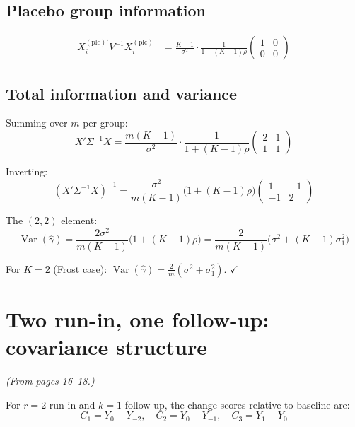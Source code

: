 \documentclass[11pt]{article}
\DeclareMathOperator{\Var}{Var}
\begin{document}
\subsection{Placebo group information}

\begin{align}
  X_i^{(\text{plc})\prime} V^{-1} X_i^{(\text{plc})}
  &= \frac{K-1}{\sigma^2}\cdot
    \frac{1}{1 + (K-1)\rho}
    \begin{pmatrix}1&0\\0&0\end{pmatrix}
\end{align}


\subsection{Total information and variance}

Summing over $m$ per group:
\begin{equation}
  X'\Sigma^{-1}X
  = \frac{m(K-1)}{\sigma^2}\cdot
    \frac{1}{1 + (K-1)\rho}
    \begin{pmatrix}2&1\\1&1\end{pmatrix}
\end{equation}

Inverting:
\begin{equation}
  (X'\Sigma^{-1}X)^{-1}
  = \frac{\sigma^2}{m(K-1)}\bigl(1 + (K-1)\rho\bigr)
    \begin{pmatrix}1&-1\\-1&2\end{pmatrix}
\end{equation}

The $(2,2)$ element:
\begin{equation}
  \boxed{
    \Var(\hat\gamma)
    = \frac{2\sigma^2}{m(K-1)}
      \bigl(1 + (K-1)\rho\bigr)
    = \frac{2}{m(K-1)}
      \bigl(\sigma^2 + (K-1)\sigma_1^2\bigr)
  }
  \label{eq:var_K}
\end{equation}

For $K = 2$ (Frost case): $\Var(\hat\gamma) =
\frac{2}{m}(\sigma^2 + \sigma_1^2)$. $\checkmark$


\section{Two run-in, one follow-up: covariance structure}
\label{sec:r2k1_R}

\noindent
\textit{(From pages 16--18.)}

\medskip
\noindent
For $r = 2$ run-in and $k = 1$ follow-up, the change
scores relative to baseline are:
\begin{equation}
  C_1 = Y_0 - Y_{-2}, \quad
  C_2 = Y_0 - Y_{-1}, \quad
  C_3 = Y_1 - Y_0
\end{equation}
\end{document}
